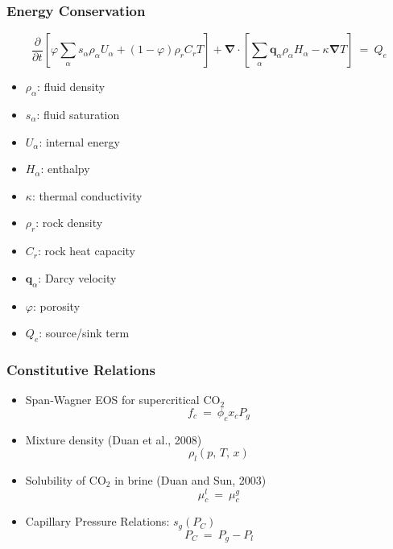 \documentclass{beamer}
\newcommand{\eq}{\ =\ }
\def\p{\partial}
\def\bnabla{\boldsymbol{\nabla}}
\renewcommand{\a}{{\alpha}}
\newcommand{\bq}{\boldsymbol{q}}
\begin{document}

\begin{frame}
\frametitle{\bf Energy Conservation}

\[
\frac{\p}{\p t} \left[\varphi \sum_\a s_\a \rho_\a U_\a + (1-\varphi) \rho_r C_r T\right]
+ \bnabla\cdot\left[\sum_\a \bq_\a \rho_\a H_\a - \kappa \bnabla T\right] \eq Q_e
\]

\begin{itemize}
\item $\rho_\a$: fluid density
\item $s_\a$: fluid saturation
\item $U_\a$: internal energy
\item $H_\a$: enthalpy
\item $\kappa$: thermal conductivity
\item $\rho_r$: rock density
\item $C_r$: rock heat capacity
\item $\bq_\a$: Darcy velocity
\item $\varphi$: porosity
\item $Q_e$: source/sink term
\end{itemize}
\end{frame}


\begin{frame}
\frametitle{\bf Constitutive Relations}

\begin{itemize}
\item Span-Wagner EOS for supercritical CO$_2$
\[ f_c^{} \eq \phi_c^{} x_c^{} P_g^{} \]

\item Mixture density (Duan et al., 2008)
\[ \rho_l^{}(p,\,T,\,x) \]

\item Solubility of CO$_2$ in brine (Duan and Sun, 2003)
\[ \mu_c^l \eq \mu_c^g \]

\item Capillary Pressure Relations: $s_g(P_C)$
\[ P_C^{} \eq P_g^{} - P_l^{} \]

\end{itemize}
\end{frame}

\end{document}
